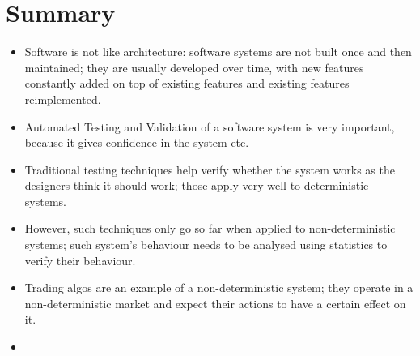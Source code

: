 \section{Summary}
\begin{itemize}
\item Software is not like architecture: software systems are not built once and then maintained; they are usually developed over time, with new features constantly added on top of existing features and existing features reimplemented.
\item Automated Testing and Validation of a software system is very important, because it gives confidence in the system etc.
\item Traditional testing techniques help verify whether the system works as the designers think it should work; those apply very well to deterministic systems.
\item However, such techniques only go so far when applied to non-deterministic systems; such system's behaviour needs to be analysed using statistics to verify their behaviour.
\item Trading algos are an example of a non-deterministic system; they operate in a non-deterministic market and expect their actions to have a certain effect on it.
\item  
\end{itemize}